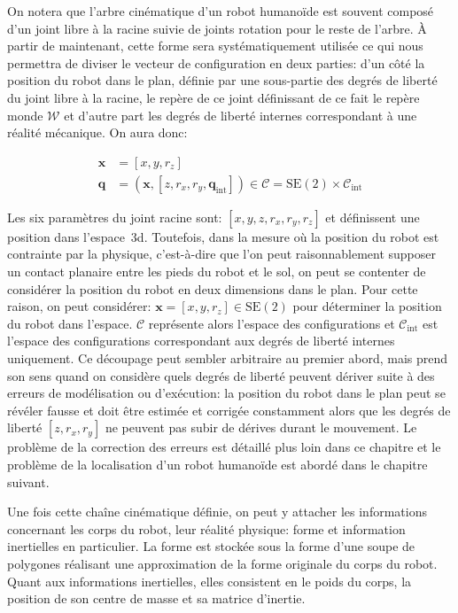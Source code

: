 On notera que l'arbre cinématique d'un robot humanoïde est souvent
composé d'un joint libre à la racine suivie de joints rotation pour le
reste de l'arbre. À partir de maintenant, cette forme sera
systématiquement utilisée ce qui nous permettra de diviser le vecteur
de configuration en deux parties: d'un côté la position du robot dans
le plan, définie par une sous-partie des degrés de liberté du joint
libre à la racine, le repère de ce joint définissant de ce fait le
repère monde $\mathcal{W}$ et d'autre part les degrés de liberté
internes correspondant à une réalité mécanique. On aura donc:

\begin{equation} \label{eq:chap2_configuration}
  \begin{aligned}
    \mathbf{x} &= [x, y, r_z]\\
    \mathbf{q} &= (\mathbf{x}, [z, r_x, r_y, \mathbf{q}_{\text{int}}])
    \in \mathcal{C} = \text{SE}(2) \times \mathcal{C}_{\text{int}}
  \end{aligned}
\end{equation}

Les six paramètres du joint racine sont: $[x, y, z, r_x, r_y, r_z]$ et
définissent une position dans l'espace 3d. Toutefois, dans la mesure
où la position du robot est contrainte par la physique, c'est-à-dire
que l'on peut raisonnablement supposer un contact planaire entre les
pieds du robot et le sol, on peut se contenter de considérer la
position du robot en deux dimensions dans le plan. Pour cette raison,
on peut considérer: $\mathbf{x} = [x, y, r_z] \in \text{SE}(2)$ pour
déterminer la position du robot dans l'espace. $\mathcal{C}$
représente alors l'espace des configurations et
$\mathcal{C}_{\text{int}}$ est l'espace des configurations
correspondant aux degrés de liberté internes uniquement. Ce découpage
peut sembler arbitraire au premier abord, mais prend son sens quand on
considère quels degrés de liberté peuvent dériver suite à des erreurs
de modélisation ou d'exécution: la position du robot dans le plan peut
se révéler fausse et doit être estimée et corrigée constamment alors
que les degrés de liberté $[z, r_x, r_y]$ ne peuvent pas subir de
dérives durant le mouvement. Le problème de la correction des erreurs
est détaillé plus loin dans ce chapitre et le problème de la
localisation d'un robot humanoïde est abordé dans le chapitre
suivant.


Une fois cette chaîne cinématique définie, on peut y attacher les
informations concernant les corps du robot, leur réalité physique:
forme et information inertielles en particulier. La forme est stockée
sous la forme d'une soupe de polygones réalisant une approximation de
la forme originale du corps du robot. Quant aux informations
inertielles, elles consistent en le poids du corps, la position de son
centre de masse et sa matrice d'inertie.



